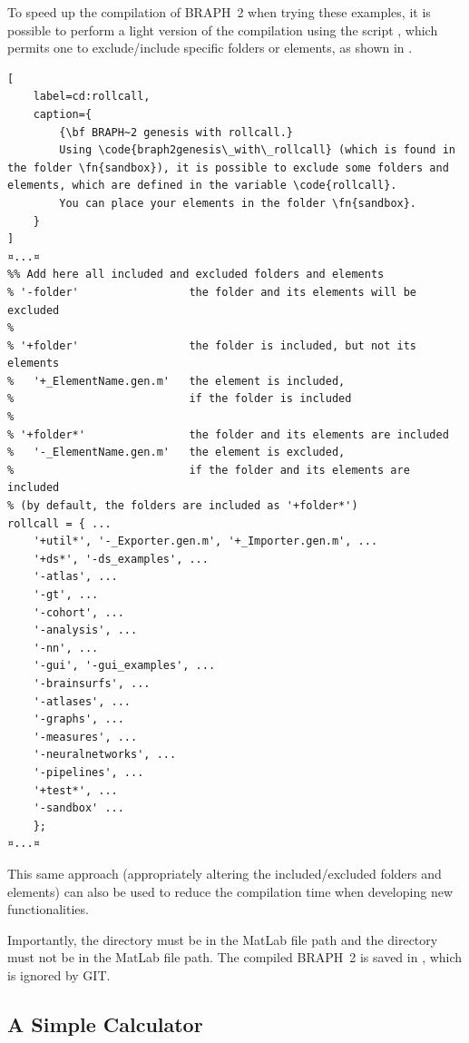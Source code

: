 \documentclass{tufte-handout}
\begin{document}
\begin{fullwidth}
\begin{tcolorbox}[
	title=Light compilation of BRAPH~2
]
To speed up the compilation of BRAPH~2 when trying these examples, it is possible to perform a light version of the compilation using the script , which permits one to exclude/include specific folders or elements, as shown in .

\begin{lstlisting}[
	label=cd:rollcall,
	caption={
		{\bf BRAPH~2 genesis with rollcall.}
		Using \code{braph2genesis\_with\_rollcall} (which is found in the folder \fn{sandbox}), it is possible to exclude some folders and elements, which are defined in the variable \code{rollcall}.
		You can place your elements in the folder \fn{sandbox}.
	}
]
¤...¤
%% Add here all included and excluded folders and elements
% '-folder'                 the folder and its elements will be excluded
%
% '+folder'                 the folder is included, but not its elements
%   '+_ElementName.gen.m'   the element is included,
%                           if the folder is included
%
% '+folder*'                the folder and its elements are included
%   '-_ElementName.gen.m'   the element is excluded,
%                           if the folder and its elements are included
% (by default, the folders are included as '+folder*')
rollcall = { ...
    '+util*', '-_Exporter.gen.m', '+_Importer.gen.m', ...
    '+ds*', '-ds_examples', ...
    '-atlas', ...
    '-gt', ...
    '-cohort', ...
    '-analysis', ...
    '-nn', ...
    '-gui', '-gui_examples', ...
    '-brainsurfs', ...
    '-atlases', ...
    '-graphs', ...
    '-measures', ...
    '-neuralnetworks', ...
    '-pipelines', ...
    '+test*', ...
    '-sandbox' ...
    };
¤...¤
\end{lstlisting}

This same approach (appropriately altering the included/excluded folders and elements) can also be used to reduce the compilation time when developing new functionalities.

Importantly, the directory  must be in the MatLab file path and the directory  must not be in the MatLab file path.
The compiled BRAPH~2 is saved in , which is ignored by GIT.
\end{tcolorbox}
\end{fullwidth}

\subsection{A Simple Calculator}
\end{document}

